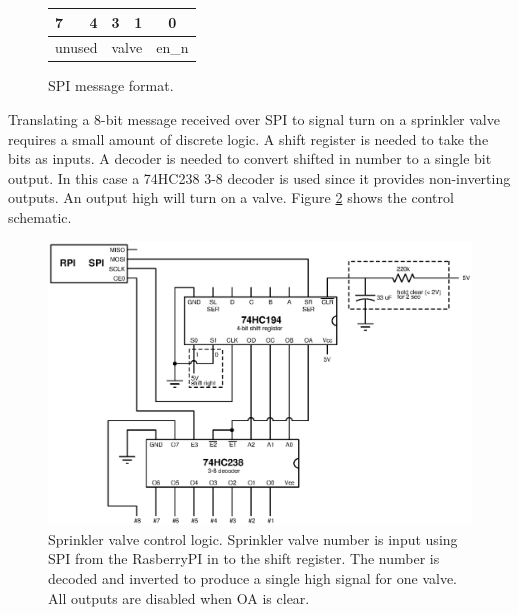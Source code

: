 \documentclass{article}
\begin{document}
{
\renewcommand*\arraystretch{1.5}
\begin{figure}[hbp]

\centering
\begin{tabular}{l r l r l r }
7 & 4 & 3 & 1 & \multicolumn{2}{c}{0} \\
\hline
\multicolumn{2}{|c|}{\hspace*{6mm} unused \hspace*{6mm}} &
\multicolumn{2}{|c|}{\hspace*{4mm} valve \hspace*{4mm}} &
\multicolumn{2}{|c|}{\hspace*{1mm} en\_n \hspace*{1mm}} \\
\hline
\end{tabular}

\caption{SPI message format.}
\label{fig:spi}
\end{figure}
}

Translating a 8-bit message received over SPI to signal turn on
a sprinkler valve requires a small amount of discrete logic.
A shift register is needed to take the bits as inputs.
A decoder is needed to convert shifted in number to a single
bit output.
In this case a 74HC238 3-8 decoder is used since it provides non-inverting
outputs.
An output high will turn on a valve.
Figure \ref{fig:control} shows the control schematic.

\begin{figure}[hbp]
\includegraphics[scale=0.85]{xcircuit/control}
\caption{Sprinkler valve control logic.
Sprinkler valve number is input using SPI from the RasberryPI in
to the shift register.  The number is decoded and inverted to produce
a single high signal for one valve.
All outputs are disabled when OA is clear.}\label{fig:control}
\end{figure}
\end{document}
